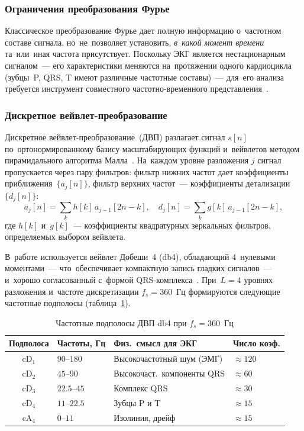 \subsubsection{Ограничения преобразования Фурье}

Классическое преобразование Фурье дает полную информацию
о~частотном составе сигнала, но~не~позволяет установить,
\textit{в~какой момент времени} та~или~иная частота присутствует.
Поскольку ЭКГ является нестационарным сигналом~--- его
характеристики меняются на~протяжении одного кардиоцикла
(зубцы~P, QRS, T имеют различные частотные составы)~---
для~его анализа требуется инструмент совместного
частотно-временного представления~\cite{zakharova2018}.

\subsubsection{Дискретное вейвлет-преобразование}

Дискретное вейвлет-преобразование~(ДВП) разлагает сигнал
$s[n]$ по~ортонормированному базису масштабирующих функций
и~вейвлетов методом пирамидального алгоритма Малла~\cite{mallat1989}.
На~каждом уровне разложения $j$ сигнал пропускается
через пару фильтров: фильтр нижних частот дает
коэффициенты приближения~$\{a_j[n]\}$, фильтр верхних частот~---
коэффициенты детализации~$\{d_j[n]\}$:
\begin{equation}
    a_j[n] = \sum_k h[k]\, a_{j-1}[2n-k], \quad
    d_j[n] = \sum_k g[k]\, a_{j-1}[2n-k],
\end{equation}
где $h[k]$ и~$g[k]$~--- коэффициенты квадратурных зеркальных
фильтров, определяемых выбором вейвлета.

В~работе используется вейвлет Добеши~4 (db4), обладающий
$4$~нулевыми моментами~--- что~обеспечивает компактную
запись гладких сигналов~--- и~хорошо согласованный
с~формой QRS-комплекса~\cite{zakharova2018}.
При~$L = 4$ уровнях разложения и~частоте дискретизации
$f_s = 360$~Гц формируются следующие частотные подполосы
(таблица~\ref{tab:wavelet_bands}).

\begin{table}[h]
\centering
\caption{Частотные подполосы ДВП db4 при $f_s = 360$~Гц}
\label{tab:wavelet_bands}
\begin{tabular}{clll}
\hline
\textbf{Подполоса} & \textbf{Частоты, Гц} & \textbf{Физ.\ смысл для ЭКГ} &
\textbf{Число коэф.} \\
\hline
$\mathrm{cD}_1$ & $90\text{–}180$ & Высокочастотный шум (ЭМГ) & $\approx 120$ \\
$\mathrm{cD}_2$ & $45\text{–}90$  & Высокочаст.\ компоненты QRS  & $\approx 60$ \\
$\mathrm{cD}_3$ & $22.5\text{–}45$& Комплекс QRS                 & $\approx 30$ \\
$\mathrm{cD}_4$ & $11\text{–}22.5$& Зубцы P и T                  & $\approx 15$ \\
$\mathrm{cA}_4$ & $0\text{–}11$   & Изолиния, дрейф              & $\approx 15$ \\
\hline
\end{tabular}
\end{table}

